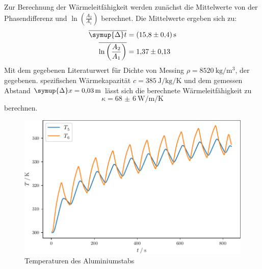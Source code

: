 Zur Berechnung der Wärmeleitfähigkeit werden zunächst die Mittelwerte von der Phasendifferenz und  $\ln \left (  \frac{A_2}{A_1} \right)$ berechnet.
Die Mittelwerte ergeben sich zu:  
\begin{align}
  \overline{\symup{\Delta} t}                     &= \SI{15.8(4)}{\second} \\
  \overline{\ln \left (  \frac{A_2}{A_1} \right)} & = \num{1.37(13)}        
\end{align}
Mit dem gegebenen Literaturwert für Dichte von Messing $\rho = \SI{8520}{\kilogram\per\meter\cubed}$, der gegebenen. spezifischen Wärmekapazität 
$c = \SI{385}{\joule\per\kilogram\per\kelvin}$ und dem gemessen Abstand $\symup{\Delta} x = \SI{0.03}{\meter}$ lässt sich die berechnete Wärmeleitfähigkeit zu
\begin{equation}
\kappa = \SI{68(6)}{\watt\per\metre\per\kelvin}
\end{equation}
berechnen.
\begin{figure}
  \caption{Temperaturen des Aluminiumstabs}
  \centering
  \includegraphics[width = \textwidth]{build/Al.pdf}
\end{figure}

